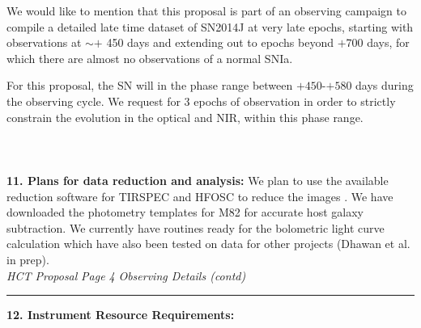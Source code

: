 \documentclass[11pt]{article}
\begin{document}
We would like to mention that this proposal is part of an observing campaign to compile a detailed late time dataset of SN2014J at very late epochs, starting with observations at $\sim +$ 450 days and extending out to epochs beyond $+$700 days, for which there are almost no observations of a normal SNIa. 

For this proposal, the SN will  in the phase range between $+450$-$+580$ days during the observing cycle.  We request for 3 epochs of observation in order to strictly constrain the evolution in the optical and NIR, within this phase range. 
\\
\\
\\
\\
{\bf 11. Plans for data reduction and analysis: }
We plan to use the available reduction software for TIRSPEC and HFOSC to reduce the images .
We have downloaded the photometry templates %
 for M82 for accurate host galaxy subtraction. 
We currently have routines ready for the bolometric light curve calculation which have also been tested on data for other projects (Dhawan et al. in prep). 
 \\


{\it HCT Proposal}\hskip 5cm {\it Page 4} \hfill {\it Observing Details (contd)}\\[1mm]
\hrule
{\bf 12. Instrument Resource Requirements:}\\[1mm]
\end{document}
